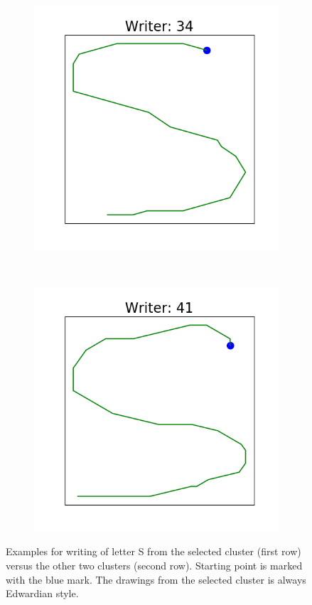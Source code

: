 \begin{figure}[!htbp]
\begin{subfigure}{0.45\textwidth}
      \end{subfigure}
      ~
      \begin{subfigure}{0.45\textwidth}
          \includegraphics[scale=0.50]{images/framework/S_34.png}
      \end{subfigure}
      ~
      \begin{subfigure}{0.45\textwidth}
          \includegraphics[scale=0.50]{images/framework/S_41.png}
      \end{subfigure}

      \caption{Examples for writing of letter S from the selected cluster (first row) versus the other two clusters (second row). Starting point is marked with the blue mark. The drawings from the selected cluster is always Edwardian style.}
      \label{fig:examples_s}
  \end{figure}

